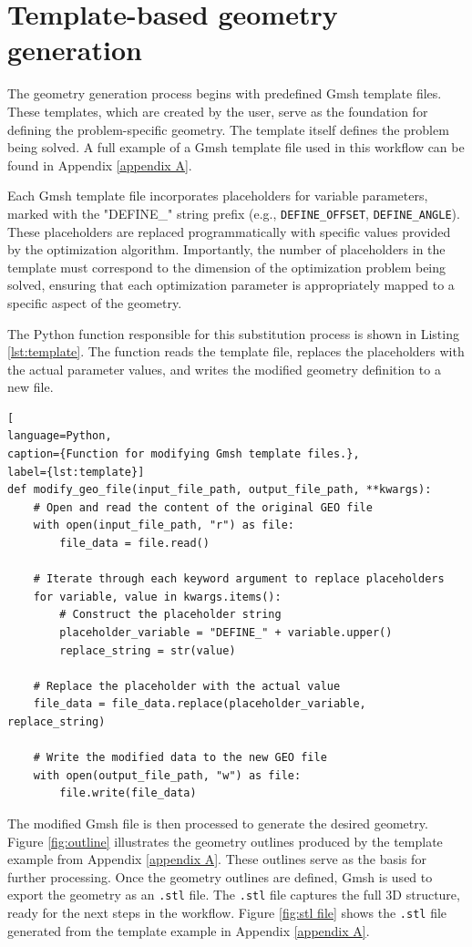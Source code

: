\section{Template-based geometry generation}

The geometry generation process begins with predefined Gmsh template files. These templates, which are created by the user, serve as the foundation for defining the problem-specific geometry. The template itself defines the problem being solved. 
A full example of a Gmsh template file used in this workflow can be found in Appendix \ref{appendix A}.

Each Gmsh template file incorporates placeholders for variable parameters, marked with the "DEFINE\_" string prefix (e.g., \texttt{DEFINE\_OFFSET}, \texttt{DEFINE\_ANGLE}). These placeholders are replaced programmatically with specific values provided by the optimization algorithm. Importantly, the number of placeholders in the template must correspond to the dimension of the optimization problem being solved, ensuring that each optimization parameter is appropriately mapped to a specific aspect of the geometry.

The Python function responsible for this substitution process is shown in Listing \ref{lst:template}. The function reads the template file, replaces the placeholders with the actual parameter values, and writes the modified geometry definition to a new file.

\newpage
\begin{lstlisting}[
language=Python,
caption={Function for modifying Gmsh template files.},
label={lst:template}]
def modify_geo_file(input_file_path, output_file_path, **kwargs):	
	# Open and read the content of the original GEO file
	with open(input_file_path, "r") as file:
		file_data = file.read()
	
	# Iterate through each keyword argument to replace placeholders
	for variable, value in kwargs.items():
		# Construct the placeholder string
		placeholder_variable = "DEFINE_" + variable.upper()
		replace_string = str(value)
	
	# Replace the placeholder with the actual value
	file_data = file_data.replace(placeholder_variable, replace_string)
	
	# Write the modified data to the new GEO file
	with open(output_file_path, "w") as file:
		file.write(file_data)
\end{lstlisting}

The modified Gmsh file is then processed to generate the desired geometry. Figure \ref{fig:outline} illustrates the geometry outlines produced by the template example from Appendix \ref{appendix A}. These outlines serve as the basis for further processing. Once the geometry outlines are defined, Gmsh is used to export the geometry as an \texttt{.stl} file. The \texttt{.stl} file captures the full 3D structure, ready for the next steps in the workflow. Figure \ref{fig:stl file} shows the \texttt{.stl} file generated from the template example in Appendix \ref{appendix A}.

